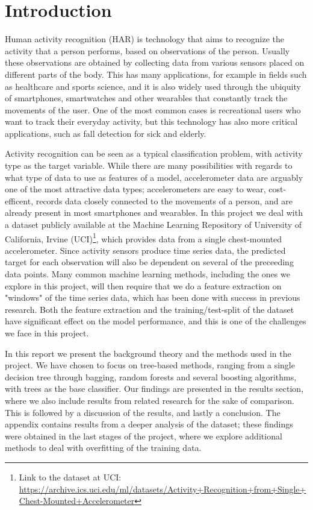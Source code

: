 \section{Introduction}\label{sec:Introduction}

Human activity recognition (HAR) is technology that aims to recognize the activity that a person performs, based on observations of the person. Usually these observations are obtained by collecting data from various sensors placed on different parts of the body. This has many applications, for example in fields such as healthcare and sports science, and it is also widely used through the ubiquity of smartphones, smartwatches and other wearables that constantly track the movements of the user. One of the most common cases is recreational users who want to track their everyday activity, but this technology has also more critical applications, such as fall detection for sick and elderly\cite{Lustrek2009}. 

Activity recognition can be seen as a typical classification problem, with activity type as the target variable. While there are many possibilities with regards to what type of data to use as features of a model, accelerometer data are arguably one of the most attractive data types; accelerometers are easy to wear, cost-efficent, records data closely connected to the movements of a person, and are already present in most smartphones and wearables. In this project we deal with a dataset publicly available at the Machine Learning Repository of University of California, Irvine (UCI)\footnote{Link to the dataset at UCI: \href{https://archive.ics.uci.edu/ml/datasets/Activity+Recognition+from+Single+Chest-Mounted+Accelerometer}{https://archive.ics.uci.edu/ml/datasets/Activity+Recognition+from+Single+Chest-Mounted+Accelerometer}}, which provides data from a single chest-mounted accelerometer. Since activity sensors produce time series data, the predicted target for each observation will also be dependent on several of the preceeding data points. Many common machine learning methods, including the ones we explore in this project, will then require that we do a feature extraction on "windows" of the time series data, which has been done with success in previous research\cite{Casale2011}. Both the feature extraction and the training/test-split of the dataset have significant effect on the model performance, and this is one of the challenges we face in this project.

In this report we present the background theory and the methods used in the project. We have chosen to focus on tree-based methods, ranging from a single decision tree through bagging, random forests and several boosting algorithms, with trees as the base classifier. Our findings are presented in the results section, where we also include results from related research\cite{ravi} for the sake of comparison. This is followed by a discussion of the results, and lastly a conclusion. The appendix contains results from a deeper analysis of the dataset; these findings were obtained in the last stages of the project, where we explore additional methods to deal with overfitting of the training data.